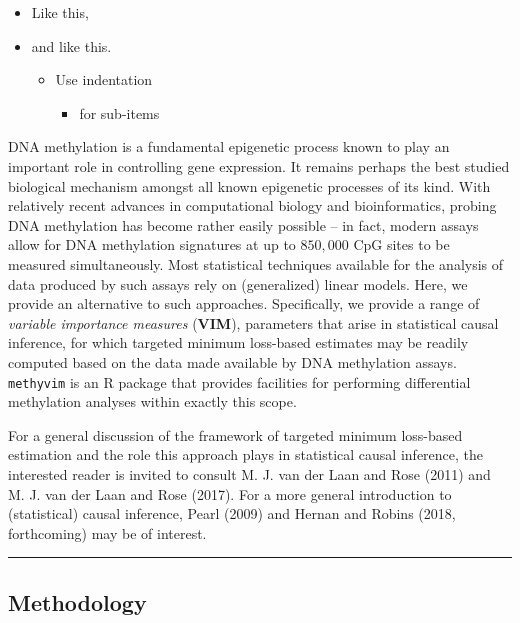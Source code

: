 \documentclass[9pt,a4paper,]{extarticle}
\theoremstyle{definition}
\theoremstyle{definition}
\theoremstyle{definition}
\theoremstyle{remark}
\begin{document}
\begin{itemize}
\item
  Like this,
\item
  and like this.

  \begin{itemize}
  \item
    Use indentation

    \begin{itemize}
    \item
      for sub-items
    \end{itemize}
  \end{itemize}
\end{itemize}

DNA methylation is a fundamental epigenetic process known to play an
important role in controlling gene expression. It remains perhaps the
best studied biological mechanism amongst all known epigenetic processes
of its kind. With relatively recent advances in computational biology
and bioinformatics, probing DNA methylation has become rather easily
possible -- in fact, modern assays allow for DNA methylation signatures
at up to \(850,000\) CpG sites to be measured simultaneously. Most
statistical techniques available for the analysis of data produced by
such assays rely on (generalized) linear models. Here, we provide an
alternative to such approaches. Specifically, we provide a range of
\emph{variable importance measures} (\textbf{VIM}), parameters that
arise in statistical causal inference, for which targeted minimum
loss-based estimates may be readily computed based on the data made
available by DNA methylation assays. \texttt{methyvim} is an R package
that provides facilities for performing differential methylation
analyses within exactly this scope.

For a general discussion of the framework of targeted minimum loss-based
estimation and the role this approach plays in statistical causal
inference, the interested reader is invited to consult M. J. van der
Laan and Rose (2011) and M. J. van der Laan and Rose (2017). For a more
general introduction to (statistical) causal inference, Pearl (2009) and
Hernan and Robins (2018, forthcoming) may be of interest.

\begin{center}\rule{0.5\linewidth}{\linethickness}\end{center}

\subsection{Methodology}\label{methodology}
\end{document}
